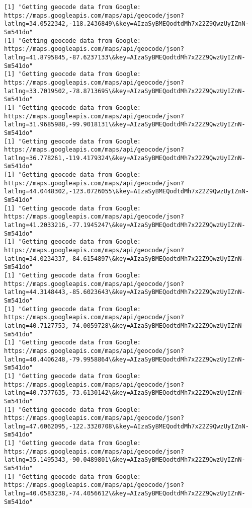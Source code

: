 \documentclass[11pt]{article}
\begin{document}
    \begin{Verbatim}[commandchars=\\\{\}]
[1] "Getting geocode data from Google: https://maps.googleapis.com/maps/api/geocode/json?latlng=34.0522342,-118.2436849\&key=AIzaSyBMEQodtdMh7x22Z9QwzUyIZnN-Sm541do"
[1] "Getting geocode data from Google: https://maps.googleapis.com/maps/api/geocode/json?latlng=41.8795845,-87.6237133\&key=AIzaSyBMEQodtdMh7x22Z9QwzUyIZnN-Sm541do"
[1] "Getting geocode data from Google: https://maps.googleapis.com/maps/api/geocode/json?latlng=33.7019502,-78.8713695\&key=AIzaSyBMEQodtdMh7x22Z9QwzUyIZnN-Sm541do"
[1] "Getting geocode data from Google: https://maps.googleapis.com/maps/api/geocode/json?latlng=31.9685988,-99.9018131\&key=AIzaSyBMEQodtdMh7x22Z9QwzUyIZnN-Sm541do"
[1] "Getting geocode data from Google: https://maps.googleapis.com/maps/api/geocode/json?latlng=36.778261,-119.4179324\&key=AIzaSyBMEQodtdMh7x22Z9QwzUyIZnN-Sm541do"
[1] "Getting geocode data from Google: https://maps.googleapis.com/maps/api/geocode/json?latlng=44.0448302,-123.0726055\&key=AIzaSyBMEQodtdMh7x22Z9QwzUyIZnN-Sm541do"
[1] "Getting geocode data from Google: https://maps.googleapis.com/maps/api/geocode/json?latlng=41.2033216,-77.1945247\&key=AIzaSyBMEQodtdMh7x22Z9QwzUyIZnN-Sm541do"
[1] "Getting geocode data from Google: https://maps.googleapis.com/maps/api/geocode/json?latlng=34.0234337,-84.6154897\&key=AIzaSyBMEQodtdMh7x22Z9QwzUyIZnN-Sm541do"
[1] "Getting geocode data from Google: https://maps.googleapis.com/maps/api/geocode/json?latlng=44.3148443,-85.6023643\&key=AIzaSyBMEQodtdMh7x22Z9QwzUyIZnN-Sm541do"
[1] "Getting geocode data from Google: https://maps.googleapis.com/maps/api/geocode/json?latlng=40.7127753,-74.0059728\&key=AIzaSyBMEQodtdMh7x22Z9QwzUyIZnN-Sm541do"
[1] "Getting geocode data from Google: https://maps.googleapis.com/maps/api/geocode/json?latlng=40.4406248,-79.9958864\&key=AIzaSyBMEQodtdMh7x22Z9QwzUyIZnN-Sm541do"
[1] "Getting geocode data from Google: https://maps.googleapis.com/maps/api/geocode/json?latlng=40.7377635,-73.6130142\&key=AIzaSyBMEQodtdMh7x22Z9QwzUyIZnN-Sm541do"
[1] "Getting geocode data from Google: https://maps.googleapis.com/maps/api/geocode/json?latlng=47.6062095,-122.3320708\&key=AIzaSyBMEQodtdMh7x22Z9QwzUyIZnN-Sm541do"
[1] "Getting geocode data from Google: https://maps.googleapis.com/maps/api/geocode/json?latlng=35.1495343,-90.0489801\&key=AIzaSyBMEQodtdMh7x22Z9QwzUyIZnN-Sm541do"
[1] "Getting geocode data from Google: https://maps.googleapis.com/maps/api/geocode/json?latlng=40.0583238,-74.4056612\&key=AIzaSyBMEQodtdMh7x22Z9QwzUyIZnN-Sm541do"

\end{Verbatim}
\end{document}
